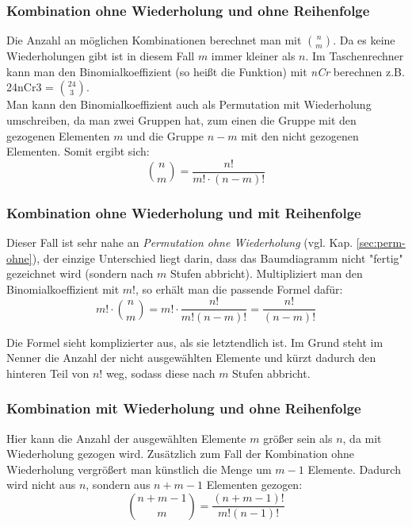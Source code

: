 \documentclass[a4paper]{article}
\newcommand\dangersign[1][2ex]{%
  \renewcommand\stacktype{L}%
  \scaleto{\stackon[1.3pt]{\color{red}$\triangle$}{\tiny !}}{#1}%
}
\begin{document}
\subsubsection{Kombination ohne Wiederholung und ohne Reihenfolge}
Die Anzahl an möglichen Kombinationen berechnet man mit $\binom{n}{m}$. Da es keine Wiederholungen gibt ist in diesem Fall $m$ immer kleiner als $n$. Im Taschenrechner kann man den Binomialkoeffizient (so heißt die Funktion) mit \textit{nCr} berechnen z.B. 24nCr3 = $\binom{24}{3}$.\\
Man kann den Binomialkoeffizient auch als Permutation mit Wiederholung umschreiben, da man zwei Gruppen hat, zum einen die Gruppe mit den gezogenen Elementen $m$ und die Gruppe $n-m$  mit den nicht gezogenen Elementen. Somit ergibt sich: $$\binom{n}{m}=\frac{n!}{m!\cdot(n-m)!}$$

\noindent {}

\subsubsection{Kombination ohne Wiederholung und mit Reihenfolge}
Dieser Fall ist sehr nahe an \textit{Permutation ohne Wiederholung} (vgl. Kap. \ref{sec:perm-ohne}), der einzige Unterschied liegt darin, dass das Baumdiagramm nicht "fertig" gezeichnet wird (sondern nach $m$ Stufen abbricht). Multipliziert man den Binomialkoeffizient mit $m!$, so erhält man die passende Formel dafür: 
$$m! \cdot \binom{n}{m} = m! \cdot \frac{n!}{m!(n-m)!} = \frac{n!}{(n-m)!}$$ 

\noindent \dangersign[3ex] Die Formel sieht komplizierter aus, als sie letztendlich ist. Im Grund steht im Nenner die Anzahl der nicht ausgewählten Elemente und kürzt dadurch den hinteren Teil von $n!$ weg, sodass diese nach $m$ Stufen abbricht.

\subsubsection{Kombination mit Wiederholung und ohne Reihenfolge}
Hier kann die Anzahl der ausgewählten Elemente $m$ größer sein als $n$, da mit Wiederholung gezogen wird. Zusätzlich zum Fall der Kombination ohne Wiederholung vergrößert man künstlich die Menge um $m-1$ Elemente. Dadurch wird nicht aus $n$, sondern aus $n+m-1$ Elementen gezogen:
$$\binom{n+m-1}{m}=\frac{(n+m-1)!}{m!(n-1)!}$$
\end{document}
